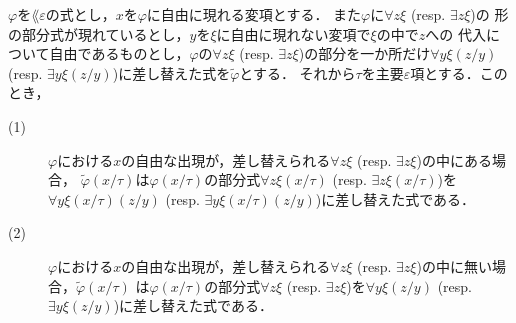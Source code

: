 	\begin{screen}
		\begin{metathm}[部分式の差し替えと代入]
		\label{metathm:subformula_replacing_and_substitution}
			$\varphi$を$\lang{\varepsilon}$の式とし，$x$を$\varphi$に自由に現れる変項とする．
			また$\varphi$に$\forall z \xi$ (resp. $\exists z \xi$)の
			形の部分式が現れているとし，$y$を$\xi$に自由に現れない変項で$\xi$の中で$z$への
			代入について自由であるものとし，$\varphi$の$\forall z \xi$ 
			(resp. $\exists z \xi$)の部分を一か所だけ$\forall y \xi(z/y)$ 
			(resp. $\exists y \xi(z/y)$)に差し替えた式を$\widetilde{\varphi}$とする．
			それから$\tau$を主要$\varepsilon$項とする．このとき，
			\begin{description}
				\item[(1)] $\varphi$における$x$の自由な出現が，差し替えられる$\forall z \xi$ 
					(resp. $\exists z \xi$)の中にある場合\footnotemark，
					$\widetilde{\varphi}(x/\tau)$は$\varphi(x/\tau)$の部分式$\forall z \xi(x/\tau)$ 
					(resp. $\exists z \xi(x/\tau)$)を$\forall y \xi(x/\tau)(z/y)$ 
					(resp. $\exists y \xi(x/\tau)(z/y)$)に差し替えた式である．
					
				\item[(2)] $\varphi$における$x$の自由な出現が，差し替えられる$\forall z \xi$ 
					(resp. $\exists z \xi$)の中に無い場合，$\widetilde{\varphi}(x/\tau)$
					は$\varphi(x/\tau)$の部分式$\forall z \xi$ 
					(resp. $\exists z \xi$)を$\forall y \xi(z/y)$ 
					(resp. $\exists y \xi(z/y)$)に差し替えた式である．
			\end{description}
		\end{metathm}
	\end{screen}
	
	
